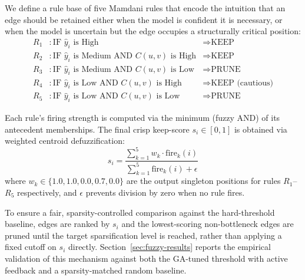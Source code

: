 \documentclass[journal]{IEEEtran}
\begin{document}
We define a rule base of five Mamdani rules that encode the intuition that an edge should be retained either when the model is confident it is necessary, or when the model is uncertain but the edge occupies a structurally critical position:
\begin{align}
    R_1&: \text{IF } \hat{y}_i \text{ is High} &\Rightarrow \text{KEEP} \\
    R_2&: \text{IF } \hat{y}_i \text{ is Medium AND } C(u,v) \text{ is High} &\Rightarrow \text{KEEP} \\
    R_3&: \text{IF } \hat{y}_i \text{ is Medium AND } C(u,v) \text{ is Low} &\Rightarrow \text{PRUNE} \\
    R_4&: \text{IF } \hat{y}_i \text{ is Low AND } C(u,v) \text{ is High} &\Rightarrow \text{KEEP (cautious)} \\
    R_5&: \text{IF } \hat{y}_i \text{ is Low AND } C(u,v) \text{ is Low} &\Rightarrow \text{PRUNE}
\end{align}
 
Each rule's firing strength is computed via the minimum (fuzzy AND) of its antecedent memberships. The final crisp keep-score $s_i \in [0,1]$ is obtained via weighted centroid defuzzification:
\begin{equation}
    s_i = \frac{\sum_{k=1}^{5} w_k \cdot \text{fire}_k(i)}{\sum_{k=1}^{5} \text{fire}_k(i) + \epsilon}
\end{equation}
where $w_k \in \{1.0, 1.0, 0.0, 0.7, 0.0\}$ are the output singleton positions for rules $R_1$--$R_5$ respectively, and $\epsilon$ prevents division by zero when no rule fires.
 
To ensure a fair, sparsity-controlled comparison against the hard-threshold baseline, edges are ranked by $s_i$ and the lowest-scoring non-bottleneck edges are pruned until the target sparsification level is reached, rather than applying a fixed cutoff on $s_i$ directly. Section~\ref{sec:fuzzy-results} reports the empirical validation of this mechanism against both the GA-tuned threshold with active feedback and a sparsity-matched random baseline.
\end{document}
